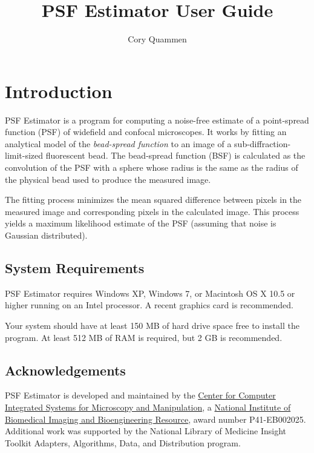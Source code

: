 \documentclass[11pt,titlepage,twoside]{article}
\title{PSF Estimator \ProgramVersion User Guide}
\author{Cory Quammen}
\begin{document}
\maketitle
\tableofcontents
\vfill

\pagebreak

\section{Introduction}

PSF Estimator is a program for computing a noise-free estimate of a point-spread function (PSF) of widefield and confocal microscopes. It works by fitting an analytical model of the \emph{bead-spread function} to an image of a sub-diffraction-limit-sized fluorescent bead. The bead-spread function (BSF) is calculated as the convolution of the PSF with a sphere whose radius is the same as the radius of the physical bead used to produce the measured image.

The fitting process minimizes the mean squared difference between pixels in the measured image and corresponding pixels in the calculated image. This process yields a maximum likelihood estimate of the PSF (assuming that noise is Gaussian distributed).

\subsection{System Requirements}

PSF Estimator \ProgramVersion requires Windows XP, Windows 7, or Macintosh OS X 10.5 or higher running on an Intel processor. A recent graphics card is recommended.

Your system should have at least 150 MB of hard drive space free to install the program. At least 512 MB of RAM is required, but 2 GB is recommended.

\subsection{Acknowledgements}

PSF Estimator \ProgramVersion is developed and maintained by the \href{http://www.cismm.org}{Center for Computer Integrated Systems for Microscopy and Manipulation}, a \href{http://www.nibib.nih.gov/}{National Institute of Biomedical Imaging and Bioengineering Resource}, award number P41-EB002025. Additional work was supported by the National Library of Medicine Insight Toolkit Adapters, Algorithms, Data, and Distribution program.
\end{document}

